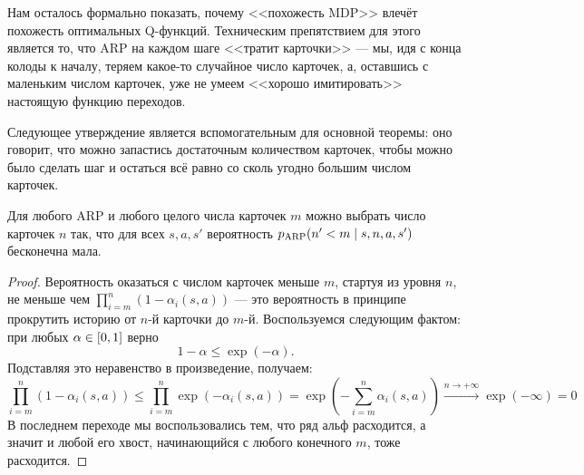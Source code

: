 Нам осталось формально показать, почему <<похожесть MDP>> влечёт похожесть оптимальных Q-функций. Техническим препятствием для этого является то, что ARP на каждом шаге <<тратит карточки>> --- мы, идя с конца колоды к началу, теряем какое-то случайное число карточек, а, оставшись с маленьким числом карточек, уже не умеем <<хорошо имитировать>> настоящую функцию переходов.

Следующее утверждение является вспомогательным для основной теоремы: оно говорит, что можно запастись достаточным количеством карточек, чтобы можно было сделать шаг и остаться всё равно со сколь угодно большим числом карточек.

\begin{theorem}
Для любого ARP и любого целого числа карточек $m$ можно выбрать число карточек $n$ так, что для всех $s, a, s'$ вероятность $p_{\ARP}(n' \HM < m \mid s, n, a, s')$ бесконечна мала. 
\begin{proof}
Вероятность оказаться с числом карточек меньше $m$, стартуя из уровня $n$, не меньше чем $\prod_{i=m}^n (1 - \alpha_i(s, a))$ ---  это вероятность в принципе прокрутить историю от $n$-й карточки до $m$-й. Воспользуемся следующим фактом: при любых $\alpha \HM\in [0, 1]$ верно
$$1 - \alpha \le \exp (-\alpha).$$
Подставляя это неравенство в произведение, получаем:
$$\prod_{i=m}^n (1 - \alpha_i(s, a)) \le \prod_{i=m}^n \exp (-\alpha_i(s, a)) = \exp \left( -\sum_{i=m}^n \alpha_i(s, a) \right) \xrightarrow{ n \to +\infty } \exp(-\infty) = 0$$
В последнем переходе мы воспользовались тем, что ряд альф расходится, а значит и любой его хвост, начинающийся с любого конечного $m$, тоже расходится.
\end{proof}
\end{theorem}

